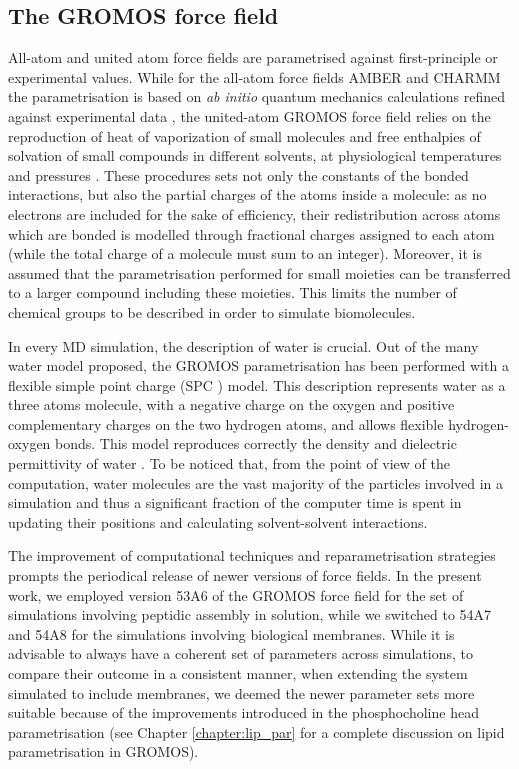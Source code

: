 \subsection{The GROMOS force field}
All-atom and united atom force fields are parametrised against first-principle or experimental values.
%
While for the all-atom force fields AMBER and CHARMM the parametrisation is based on \emph{ab initio} quantum mechanics calculations refined against experimental data \citep{Maier2015,Dickson2014,Wang2004_amber,MacKerell1998,Klauda2010}, the united-atom GROMOS force field relies on the reproduction of heat of vaporization of small molecules and free enthalpies of solvation of small compounds in different solvents, at physiological temperatures and pressures \citep{Oostenbrink2005,Schmid2011,Reif2013}.
%
These procedures sets not only the constants of the bonded interactions, but also the partial charges of the atoms inside a molecule: as no electrons are included for the sake of efficiency, their redistribution across atoms which are bonded is modelled through fractional charges assigned to each atom (while the total charge of a molecule must sum to an integer).
%
Moreover, it is assumed that the parametrisation performed for small moieties can be transferred to a larger compound including these moieties. This limits the number of chemical groups to be described in order to simulate biomolecules.

In every MD simulation, the description of water is crucial. Out of the many water model proposed, the GROMOS parametrisation has been performed with a flexible simple point charge (SPC \citep{Berendsen1981}) model. This description represents water as a three atoms molecule, with a negative charge on the oxygen and positive complementary charges on the two hydrogen atoms, and allows flexible hydrogen-oxygen bonds. This model reproduces correctly the density and dielectric permittivity of water \citep{Mark2001}. To be noticed that, from the point of view of the computation, water molecules are the vast majority of the particles involved in a simulation and thus a significant fraction of the computer time is spent in updating their positions and calculating solvent-solvent interactions.

The improvement of computational techniques and reparametrisation strategies prompts the periodical release of newer versions of force fields. In the present work, we employed version 53A6 of the GROMOS force field \citep{Oostenbrink2004} for the set of simulations involving peptidic assembly in solution, while we switched to 54A7 \citep{Schmid2011} and 54A8 \citep{Reif2013} for the simulations involving biological membranes. While it is advisable to always have a coherent set of parameters across simulations, to compare their outcome in a consistent manner, when extending the system simulated to include membranes, we deemed the newer parameter sets more suitable because of the improvements introduced in the phosphocholine head parametrisation \citep{Marzuoli2019} (see Chapter \ref{chapter:lip_par} for a complete discussion on lipid parametrisation in GROMOS).

